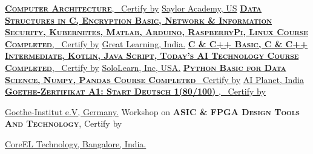 \begin{rubric}{}
\entry*[2023] 
\href{https://learn.saylor.org/pluginfile.php/1/tool_certificate/issues/1691334763/7172132402TS.pdf}
{\textbf{\textsc{Computer Architecture}}, \faCertificate\ Certify by}
\href{https://learn.saylor.org/admin/tool/certificate/index.php?code=7172132402TS}{ Saylor Academy, US}
\vspace*{-1mm}
\entry*[2023 ] 
\href{https://www.mygreatlearning.com/}
{\textbf{\textsc{Data Structures in C, Encryption Basic, Network \& Information Security, Kubernetes, Matlab, Arduino, RaspberryPi, Linux Course Completed}}, \faCertificate\ Certify by} 
\href{https://www.mygreatlearning.com/}{ Great Learning, India.}
\vspace*{-1mm}
\entry*[2018-2023] 
\href{https://www.sololearn.com/}
{\textbf{\textsc{C \& C++ Basic, C \& C++ Intermediate, Kotlin, Java Script, Today's AI Technology Course Completed}}, \faCertificate\ Certify by}
\href{https://www.sololearn.com/}{ SoloLearn, Inc, USA.}
\vspace*{-1mm}
\entry*[2022] 
\href{https://aiplanet.com/course/certificates/verify/56ce4f81-e707-44c8-86c8-2114e1b86095/}
{\textbf{\textsc{ Python Basic for Data Science, Numpy, Pandas Course Completed}} \faCertificate\ Certify by}
\href{https://aiplanet.com/}{ AI Planet, India}
\vspace*{-1mm}
\entry*[2021] 
\href{https://drive.google.com/file/d/13t3dAIsaC9d6DsTbY-0_zIfsPfb3ox4x/view?usp=sharing}
{\textbf{\textsc{Goethe-Zertifikat A1: Start Deutsch 1(80/100) }}, \faCertificate\ Certify by} \par
\href{https://www.goethe.de/de/index.html/}{ Goethe-Institut e.V, Germany.}
\vspace*{-1mm}
\entry*[2012] Workshop on \textbf{ \textsc{ASIC \& FPGA Design Tools And Technology}}, Certify by \par
\href{https://coreel.com/}{CoreEL Technology, Bangalore, India.}
\vspace*{-1mm}
\end{rubric}